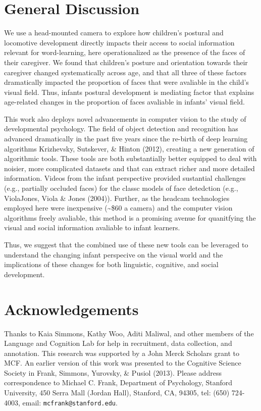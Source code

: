 \documentclass[10pt, letterpaper]{article}
\begin{document}
\section{General Discussion}\label{general-discussion}

We use a head-mounted camera to explore how children's postural and
locomotive development directly impacts their access to social
information relevant for word-learning, here operationalized as the
presence of the faces of their caregiver. We found that children's
posture and orientation towards their caregiver changed systematically
across age, and that all three of these factors dramatically impacted
the proportion of faces that were avaliable in the child's visual field.
Thus, infants postural development is mediating factor that explains
age-related changes in the proportion of faces avaliable in infants'
visual field.

This work also deploys novel advancements in computer vision to the
study of developmental psychology. The field of object detection and
recognition has advanced dramatically in the past five years since the
re-birth of deep learning algorithms Krizhevsky, Sutskever, \& Hinton
(2012), creating a new generation of algorithmic tools. These tools are
both substantially better equipped to deal with noisier, more
complicated datasets and that can extract richer and more detailed
information. Videos from the infant perspective provided sustantial
challenges (e.g., partially occluded faces) for the classc models of
face detedction (e.g., ViolaJones, Viola \& Jones (2004)). Further, as
the headcam technologies employed here were inexpensive
(\textasciitilde{}\$60 a camera) and the computer vision algorithms
freely avaliable, this method is a promising avenue for quanitfying the
visual and social information avaliable to infant learners.

Thus, we suggest that the combined use of these new tools can be
leveraged to understand the changing infant perspecive on the visual
world and the implications of these changes for both linguistic,
cognitive, and social development.

\section{Acknowledgements}\label{acknowledgements}

Thanks to Kaia Simmons, Kathy Woo, Aditi Maliwal, and other members of
the Language and Cognition Lab for help in recruitment, data collection,
and annotation. This research was supported by a John Merck Scholars
grant to MCF. An earlier version of this work was presented to the
Cognitive Science Society in Frank, Simmons, Yurovsky, \& Pusiol (2013).
Please address correspondence to Michael C. Frank, Department of
Psychology, Stanford University, 450 Serra Mall (Jordan Hall), Stanford,
CA, 94305, tel: (650) 724-4003, email: \texttt{mcfrank@stanford.edu}.
\end{document}
